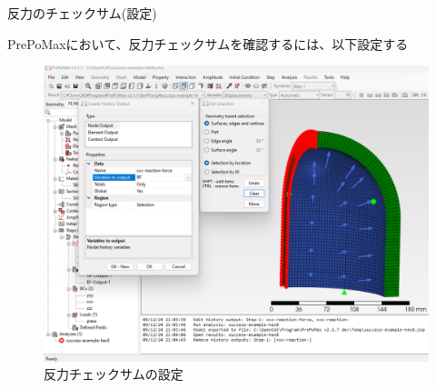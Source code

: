 \begin{frame}{反力のチェックサム(設定)}
 
  PrePoMaxにおいて、反力チェックサムを確認するには、以下設定する \\
  \begin{figure}[htbp]
    \begin{center}
      \includegraphics[keepaspectratio,scale=0.285]{images/screen01.png}
      \caption{反力チェックサムの設定}
    \end{center}
  \end{figure}
\end{frame}
